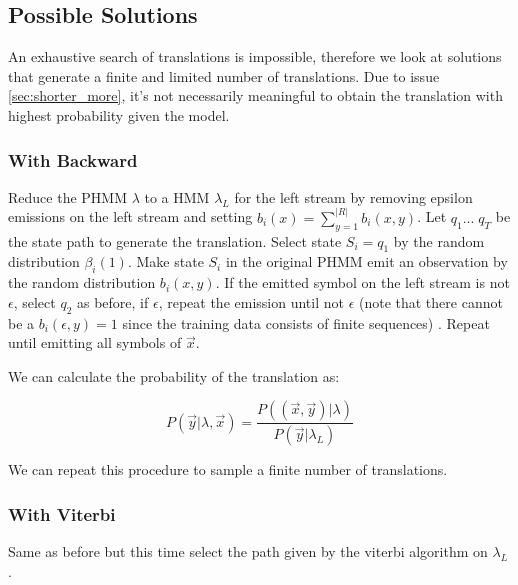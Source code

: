 \documentclass[a4paper,10pt]{article}
\begin{document}
\subsection{Possible Solutions}

An exhaustive search of translations is impossible, therefore we look at
solutions that generate a finite and limited number of translations. Due to
issue \ref{sec:shorter_more}, it's not necessarily meaningful to obtain the
translation with highest probability given the model.

\subsubsection{With Backward}

Reduce the PHMM $\lambda$ to a HMM $\lambda_{L}$ for the left stream by removing
epsilon emissions on the left stream and setting $b_i(x) =
\displaystyle\sum_{y=1}^{|R|} b_i(x, y)$. Let $q_1 ... \; q_T$ be the state path
to generate the translation. Select state $S_i = q_1$ by the random distribution
$\beta_i(1)$. Make state $S_i$ in the original PHMM emit an observation by the
random distribution $b_i(x, y)$. If the emitted symbol on the left stream is not
$\epsilon$, select $q_2$ as before, if $\epsilon$, repeat the emission until not
$\epsilon$ (note that there cannot be a $b_i(\epsilon, y) = 1$ since the
training data consists of finite sequences) . Repeat until emitting all symbols
of $\vec{x}$.

We can calculate the probability of the translation as:

$$P(\vec{y}|\lambda, \vec{x}) = \frac{P((\vec{x},
  \vec{y})|\lambda)}{P(\vec{y}|\lambda_L)}$$

We can repeat this procedure to sample a finite number of translations.

\subsubsection{With Viterbi}

Same as before but this time select the path given by the viterbi algorithm on
$\lambda_L$.




{\small

}
\end{document}
